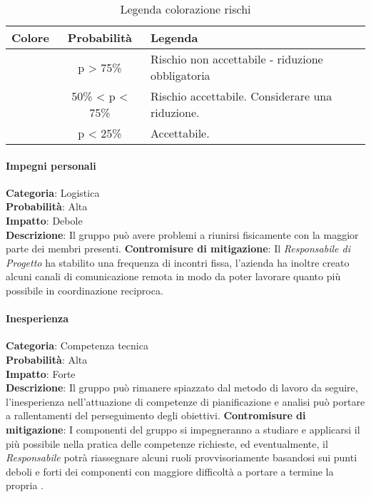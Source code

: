 \documentclass{scalatekids-article}
\begin{document}
\begin{table}[H]
  \centering
  \caption{Legenda colorazione rischi}
  \begin{tabular}{|c|c|l|}
    \hline \bf Colore & \bf Probabilità & \bf Legenda \\
    \hline \cellcolor{red! 50} & p > 75\% & Rischio non accettabile - riduzione obbligatoria \\
    \hline \cellcolor{yellow! 50} & 50\% < p < 75\% & Rischio accettabile. Considerare una riduzione. \\
    \hline \cellcolor{green! 50} & p < 25\% & Accettabile. \\
    \hline
  \end{tabular}
\end{table}
\paragraph{Impegni personali}
\textbf{Categoria}: Logistica\\
\textbf{Probabilità}: Alta\\
\textbf{Impatto}: Debole\\
\textbf{Descrizione}: Il gruppo può avere problemi a riunirsi fisicamente con la maggior parte dei membri presenti.
\textbf{Contromisure di mitigazione}: Il \textit{Responsabile di Progetto} ha stabilito una frequenza di incontri fissa,
l'azienda ha inoltre creato alcuni canali di comunicazione remota in modo da poter lavorare quanto più possibile in
coordinazione reciproca.
\paragraph{Inesperienza}
\textbf{Categoria}: Competenza tecnica\\
\textbf{Probabilità}: Alta\\
\textbf{Impatto}: Forte\\
\textbf{Descrizione}: Il gruppo può rimanere spiazzato dal metodo di lavoro da seguire, l'inesperienza nell'attuazione
di competenze di pianificazione e analisi può portare a rallentamenti del perseguimento degli obiettivi.
\textbf{Contromisure di mitigazione}: I componenti del gruppo si impegneranno a studiare e applicarsi il più possibile
nella pratica delle competenze richieste, ed eventualmente, il \textit{Responsabile} potrà riassegnare alcuni ruoli provvisoriamente
basandosi sui punti deboli e forti dei componenti con maggiore difficoltà a portare a termine la propria .
\end{document}
